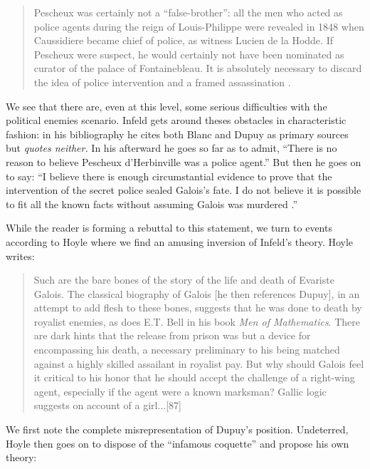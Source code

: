 \documentclass[12pt]{article}
\begin{document}
\begin{quote}
Pescheux was certainly not a ``false-brother'': all the men who acted as police agents during the reign of Louis-Philippe were revealed in 1848 when Caussidiere became chief of police, as witness Lucien de la Hodde. If Pescheux were suspect, he would certainly not have been nominated as curator of the palace of Fontainebleau. It is absolutely necessary to discard the idea of police intervention and a framed assassination \cite{85}.
\end{quote}
We see that there are, even at this level, some serious difficulties with the political enemies scenario. Infeld gets around theses obstacles in characteristic fashion: in his bibliography he cites both Blanc and Dupuy as primary sources but {\it quotes neither.} In his afterward he goes so far as to admit, ``There is no reason to believe Pescheux d'Herbinville was a police agent.'' But then he goes on to say: ``I believe there is enough circumstantial evidence to prove that the intervention of the secret police sealed Galois's fate. I do not believe it is possible to fit all the known facts without assuming Galois was murdered \cite{86}.''

While the reader is forming a rebuttal to this statement, we turn to events according to Hoyle where we find an amusing inversion of Infeld's theory. Hoyle writes:

\begin{quote}
Such are the bare bones of the story of the life and death of Evariste Galois. The classical biography of Galois [he then references Dupuy], in an attempt to add flesh to these bones, suggests that he was done to death by royalist enemies, as does E.T. Bell in his book\emph{ Men of Mathematics}. There are dark hints that the release from prison was but a device for encompassing his death, a necessary preliminary to his being matched against a highly skilled assailant in royalist pay. But why should Galois feel it critical to his honor that he should accept the challenge of a right-wing agent, especially if the agent were a known marksman? Gallic logic suggests on account of a girl...[87]
\end{quote}
We first note the complete misrepresentation of Dupuy's position. Undeterred, Hoyle then goes on to dispose of the ``infamous coquette'' and propose his own theory:
\end{document}

